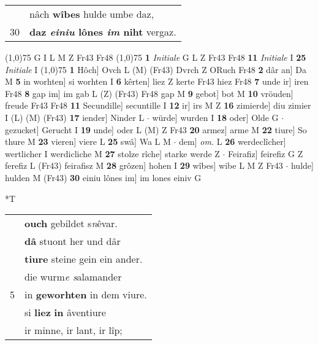 \documentclass[8pt,a4paper,notitlepage]{article}
\begin{document}
\begin{table}[ht]
\begin{minipage}[t]{0.5\linewidth}
\begin{tabular}{rl}
 & nâch \textbf{wîbes} hulde umbe daz,\\ 
30 & \textbf{daz \textit{einiu} lônes \textit{im} niht} vergaz.\\ 
\end{tabular}
\scriptsize
\line(1,0){75} \newline
G I L M Z Fr43 Fr48 \newline
\line(1,0){75} \newline
\textbf{1} \textit{Initiale} G L Z Fr43 Fr48  \textbf{11} \textit{Initiale} I  \textbf{25} \textit{Initiale} I  \newline
\line(1,0){75} \newline
\textbf{1} Hôch] Ovch L (M) (Fr43) Dvrch Z ORuch Fr48 \textbf{2} dâr an] Da M \textbf{5} in worhten] si worhten I \textbf{6} kêrten] liez Z kerte Fr43 hiez Fr48 \textbf{7} unde ir] iren Fr48 \textbf{8} gap im] im gab L (Z) (Fr43) Fr48 gap M \textbf{9} gebot] bot M \textbf{10} vröuden] freude Fr43 Fr48 \textbf{11} Secundille] secuntille I \textbf{12} ir] irs M Z \textbf{16} zimierde] diu zimier I (L) (M) (Fr43) \textbf{17} iender] Ninder L  $\cdot$ würde] wurden I \textbf{18} oder] Olde G  $\cdot$ gezucket] Gerucht I \textbf{19} unde] oder L (M) Z Fr43 \textbf{20} armez] arme M \textbf{22} tiure] So thure M \textbf{23} vieren] viere L \textbf{25} swâ] Wa L M  $\cdot$ dem] \textit{om.} L \textbf{26} werdeclîcher] wertlicher I werdicliche M \textbf{27} stolze rîche] starke werde Z  $\cdot$ Feirafiz] feirefiz G Z ferefiz L (Fr43) feirafisz M \textbf{28} grôzen] hohen I \textbf{29} wîbes] wibe L M Z Fr43  $\cdot$ hulde] hulden M (Fr43) \textbf{30} einiu lônes im] im lones einiv G \newline
\end{minipage}
\hspace{0.5cm}
\begin{minipage}[t]{0.5\linewidth}
\small
\begin{center}*T
\end{center}
\begin{tabular}{rl}
 & \textbf{ouch} gebildet s\textit{n}êvar.\\ 
 & \textbf{dâ} stuont her und dâr\\ 
 & \textbf{tiure} steine gein ein ander.\\ 
 & die wurm\textit{e s}alamander\\ 
5 & in \textbf{geworhten} in dem viure.\\ 
 & si \textbf{liez} \textbf{in} âventiure\\ 
 & ir minne, ir lant, ir lîp;\\ 

\end{tabular}
\end{minipage}
\end{table}
\end{document}
